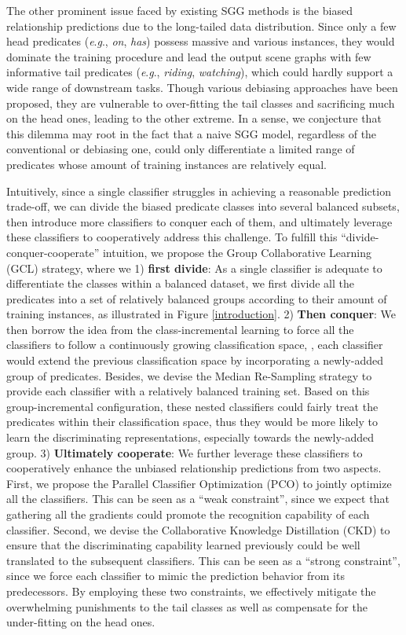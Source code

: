 \documentclass[10pt,twocolumn,letterpaper]{article}
\begin{document}
The other prominent issue faced by existing SGG methods is the biased relationship predictions due to the long-tailed data distribution. Since only a few head predicates (\textit{e}.\textit{g}., \textit{on}, \textit{has}) possess massive and various instances, they would dominate the training procedure and lead the output scene graphs with few informative tail predicates (\textit{e}.\textit{g}., \textit{riding}, \textit{watching}), which could hardly support a wide range of downstream tasks. Though various debiasing approaches\cite{suhail2021energy, chiou2021recovering, wen2020unbiased} have been proposed, they are vulnerable to over-fitting the tail classes and sacrificing much on the head ones, leading to the other extreme. In a sense, we conjecture that this dilemma may root in the fact that a naive SGG model, regardless of the conventional or debiasing one, could only differentiate a limited range of predicates whose amount of training instances are relatively equal. 


Intuitively, since a single classifier struggles in achieving a reasonable prediction trade-off, we can divide the biased predicate classes into several balanced subsets, then introduce more classifiers to conquer each of them, and ultimately leverage these classifiers to cooperatively address this challenge. To fulfill this ``divide-conquer-cooperate'' intuition, we propose the Group Collaborative Learning (GCL) strategy, where we 1) \textbf{first divide}: As a single classifier is adequate to differentiate the classes within a balanced dataset, we first divide all the predicates into a set of relatively balanced groups according to their amount of training instances, as illustrated in Figure \ref{introduction}. 2) \textbf{Then conquer}: We then borrow the idea from the class-incremental learning \cite{hu2020learning} to force all the classifiers to follow a continuously growing classification space, \ie, each classifier would extend the previous classification space by incorporating a newly-added group of predicates. Besides, we devise the Median Re-Sampling strategy to provide each classifier with a relatively balanced training set. Based on this group-incremental configuration, these nested classifiers could fairly treat the predicates within their classification space, thus they would be more likely to learn the discriminating representations, especially towards the newly-added group. 3) \textbf{Ultimately cooperate}: We further leverage these classifiers to cooperatively enhance the unbiased relationship predictions from two aspects. First, we propose the Parallel Classifier Optimization (PCO) to jointly optimize all the classifiers. This can be seen as a ``weak constraint'', since we expect that gathering all the gradients could promote the recognition capability of each classifier. Second, we devise the Collaborative Knowledge Distillation (CKD) to ensure that the discriminating capability learned previously could be well translated to the subsequent classifiers. This can be seen as a ``strong constraint'', since we force each classifier to mimic the prediction behavior from its predecessors. By employing these two constraints, we effectively mitigate the overwhelming punishments to the tail classes as well as compensate for the under-fitting on the head ones.
\end{document}
